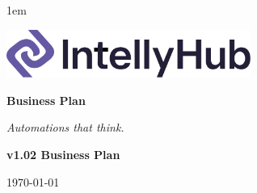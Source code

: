   {\thesubsubsection}{1em}{}

\pagestyle{fancy}
\fancyhf{} %
\fancyhead[L]{\textcolor{PrimaryColor}{\small Business Plan}}
\fancyfoot[C]{\textcolor{DarkGray}{\thepage}}
\renewcommand{\headrulewidth}{0.4pt}
\renewcommand{\footrulewidth}{0.4pt}
\renewcommand{\headrule}{\color{PrimaryColor}\hrule}
\renewcommand{\footrule}{\color{PrimaryColor}\hrule}



\thispagestyle{empty} 
\begin{titlepage}
    \centering
    \vspace*{1cm}
    
    \includegraphics[width=0.6\textwidth]{IntellyHub_Logo_Colored.png}
    
    \vspace{2.5cm}
    
    {\Huge\bfseries\color{PrimaryColor}Business Plan}
    
    \vspace{1.5cm}
    
    {\Large\itshape\lightfont Automations that think.}
    
    \vfill %
    
    {\large\bfseries\color{PrimaryColor}v1.02 \color{SecondaryColor}Business Plan}
    
    \vspace{0.5cm}
    
    {\large \today}
    
\end{titlepage}

\tableofcontents
\newpage

